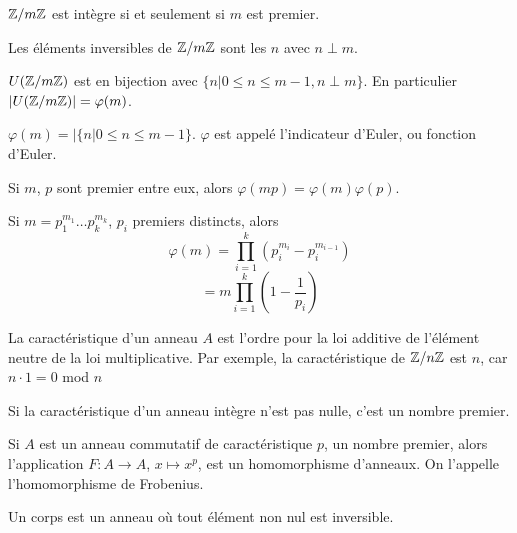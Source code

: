 \documentclass[12pt,a4paper]{article}
\begin{document}
\begin{flushleft}
\begin{prop} 
$\mathbb{Z} / m \mathbb{Z}$ est intègre si et seulement si $m$ est premier.
\end{prop}

\begin{prop}
Les éléments inversibles de $\mathbb{Z} / m \mathbb{Z}$ sont les $n$ avec $ n \perp m$. 
\end{prop}

\begin{cor}
$U(\mathbb{Z} / m \mathbb{Z} )$ est en bijection avec $\{ n | 0 \leqslant n \leqslant m-1, n \perp m  \} $. En particulier $| U(\mathbb{Z} / m \mathbb{Z})| = \varphi (m)$.
\end{cor}

\begin{rap}
$\varphi (m) = | \{ n | 0 \leqslant n \leqslant m-1 \}$. $\varphi$ est appelé l'indicateur d'Euler, ou fonction d'Euler.
\end{rap}

\begin{prop}
Si $m$, $p$ sont premier entre eux, alors $\varphi (m p) = \varphi (m) \varphi (p)$.
\end{prop}

\begin{cor}
Si $m = p_1^{m_1} \ldots p_k^{m_k}$, $p_i$ premiers distincts, alors 
$$ \varphi (m) = \prod_{i = 1}^{k} (p_i^{m_i} - p_i^{m_{i-1}})$$
$$= m \prod_{i = 1}^{k} (1-\frac{1}{p_i}) $$
\end{cor}

\begin{mydef}
La caractéristique d'un anneau $A$ est l'ordre pour la loi additive de l'élément neutre de la loi multiplicative. Par exemple, la caractéristique de $\mathbb{Z} / n \mathbb{Z}$ est $n$, car $n \cdot 1 = 0$ mod $n$
\end{mydef}

\begin{prop}
Si la caractéristique d'un anneau intègre n'est pas nulle, c'est un nombre premier.
\end{prop}

\begin{prop}
Si $A$ est un anneau commutatif de caractéristique $p$, un nombre premier, alors l'application $F: A \rightarrow A$, $x \mapsto x^p$, est un homomorphisme d'anneaux. On l'appelle l'homomorphisme de Frobenius.
\end{prop}

\begin{mydef}
Un corps est un anneau où tout élément non nul est inversible.
\end{mydef}


\end{flushleft}
\end{document}
